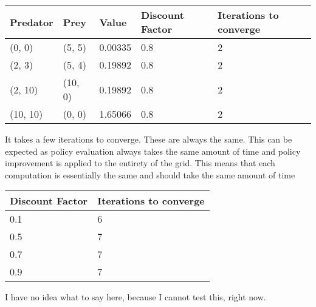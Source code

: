 \documentclass{article}
\begin{document}
\iffalse
As described in the introduction, the agent can move North, South, East, West and Wait. To keep notation as clear and concise as possible, only the first letter of the optimal policy is printed. For clarity, the state 'Wait' is renamed to 'Hold' and is depicted as 'H' where applicable. 
\fi


\begin{center}
	\begin{tabular}{ l | l | l | l | l }
		Predator & Prey & Value & Discount Factor & Iterations to converge \\ 
		\hline
		(0, 0) & (5, 5) & 0.00335 & 0.8 & 2 \\
		(2, 3) & (5, 4) & 0.19892 & 0.8 & 2 \\
		(2, 10) & (10, 0) & 0.19892 & 0.8 & 2 \\
		(10, 10) & (0, 0) & 1.65066 & 0.8 & 2 \\	
	\end{tabular}
\end{center}

It takes a few iterations to converge. These are always the same. This can be expected as policy evaluation always takes the same amount of time and policy improvement is applied to the entirety of the grid. This means that each computation is essentially the same and should take the same amount of time

\begin{center}
	\begin{tabular}{ l || l }
		Discount Factor & Iterations to converge \\ 
		\hline
		0.1 & 6 \\
		0.5 & 7 \\
		0.7 & 7 \\
		0.9 & 7 \\	
	\end{tabular}
\end{center}

I have no idea what to say here, because I cannot test this, right now.
\end{document}
